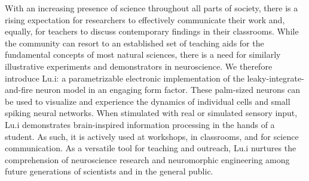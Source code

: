 \begin{itemize}
        With an increasing presence of science throughout all parts of society, there is a rising expectation for researchers to effectively communicate their work and, equally, for teachers to discuss contemporary findings in their classrooms. While the community can resort to an established set of teaching aids for the fundamental concepts of most natural sciences, there is a need for similarly illustrative experiments and demonstrators in neuroscience. We therefore introduce Lu.i: a parametrizable electronic implementation of the leaky-integrate-and-fire neuron model in an engaging form factor. These palm-sized neurons can be used to visualize and experience the dynamics of individual cells and small spiking neural networks. When stimulated with real or simulated sensory input, Lu.i demonstrates brain-inspired information processing in the hands of a student. As such, it is actively used at workshops, in classrooms, and for science communication. As a versatile tool for teaching and outreach, Lu.i nurtures the comprehension of neuroscience research and neuromorphic engineering among future generations of scientists and in the general public.
\end{itemize}

